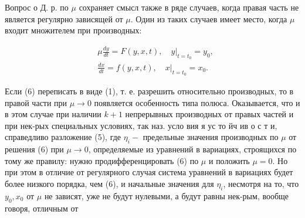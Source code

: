 \documentclass[10pt]{article}
\begin{document}
Вопрос о Д. р. по $\mu$ сохраняет смысл также в ряде случаев, когда правая часть не является регулярно зависящей от $\mu$. Один из таких случаев имеет место, когда $\mu$ входит множителем при производных:



\[

\begin{aligned}

& \mu \frac{d y}{d t}=F(y, x, t),\left.\quad y\right|_{t=t_{0}}=y_{0}, \\

& \frac{d x}{d t}=f(y, x, t),\left.\quad x\right|_{t=t_{0}}=x_{0} .

\end{aligned}

\]



Если (6) переписать в виде (1), т. е. разрешить относительно производных, то в правой части при $\mu \rightarrow 0$ появляется особенность типа полюса. Оказывается, что и в этом случае при наличии $k+1$ непрерывных производных от правых частей и при нек-рых специальных условиях, так наз. усло вия я ус то йч ив о с т и, справедливо разложение (5), где $\eta_{i}-$ предельные значения производных по $\mu$ от решения (6) при $\mu \rightarrow 0$, определяемые из уравнений в вариациях, строящихся по тому же правилу: нужно продифференцировать (6) по $\mu$ и положить $\mu=0$. Но при этом в отличие от регулярного случая система уравнений в вариациях будет более низкого порядка, чем (6), и начальные значения для $\eta_{i}$, несмотря на то, что $y_{0}, x_{0}$ от $\mu$ не зависят, уже не будут нулевыми, а будут равны нек-рым, вообще говоря, отличным от
\end{document}
